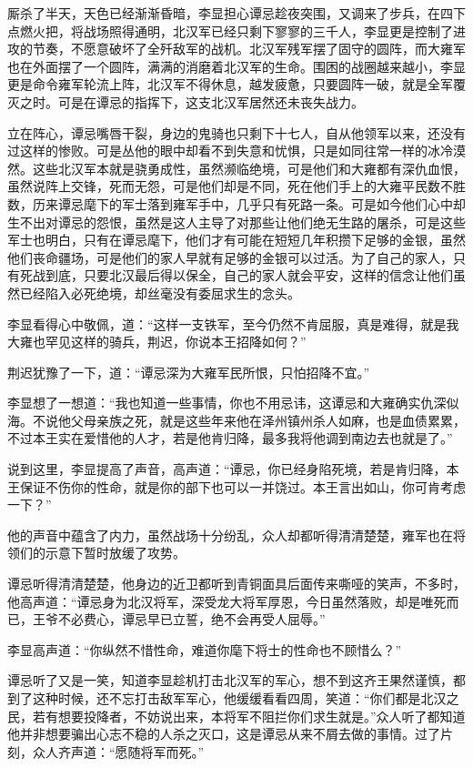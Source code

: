 厮杀了半天，天色已经渐渐昏暗，李显担心谭忌趁夜突围，又调来了步兵，在四下点燃火把，将战场照得通明，北汉军已经只剩下寥寥的三千人，李显更是控制了进攻的节奏，不愿意破坏了全歼敌军的战机。北汉军残军摆了固守的圆阵，而大雍军也在外面摆了一个圆阵，满满的消磨着北汉军的生命。围困的战圈越来越小，李显更是命令雍军轮流上阵，北汉军不得休息，越发疲惫，只要圆阵一破，就是全军覆灭之时。可是在谭忌的指挥下，这支北汉军居然还未丧失战力。

立在阵心，谭忌嘴唇干裂，身边的鬼骑也只剩下十七人，自从他领军以来，还没有过这样的惨败。可是丛他的眼中却看不到失意和忧惧，只是如同往常一样的冰冷漠然。这些北汉军本就是骁勇成性，虽然濒临绝境，可是他们和大雍都有深仇血恨，虽然说阵上交锋，死而无怨，可是他们却是不同，死在他们手上的大雍平民数不胜数，历来谭忌麾下的军士落到雍军手中，几乎只有死路一条。可是如今他们心中却生不出对谭忌的怨恨，虽然是这人主导了对那些让他们绝无生路的屠杀，可是这些军士也明白，只有在谭忌麾下，他们才有可能在短短几年积攒下足够的金银，虽然他们丧命疆场，可是他们的家人早就有足够的金银可以过活。为了自己的家人，只有死战到底，只要北汉最后得以保全，自己的家人就会平安，这样的信念让他们虽然已经陷入必死绝境，却丝毫没有委屈求生的念头。

李显看得心中敬佩，道：“这样一支铁军，至今仍然不肯屈服，真是难得，就是我大雍也罕见这样的骑兵，荆迟，你说本王招降如何？”

荆迟犹豫了一下，道：“谭忌深为大雍军民所恨，只怕招降不宜。”

李显想了一想道：“我也知道一些事情，你也不用忌讳，这谭忌和大雍确实仇深似海。不说他父母亲族之死，就是这些年来他在泽州镇州杀人如麻，也是血债累累，不过本王实在爱惜他的人才，若是他肯归降，最多我将他调到南边去也就是了。”

说到这里，李显提高了声音，高声道：“谭忌，你已经身陷死境，若是肯归降，本王保证不伤你的性命，就是你的部下也可以一并饶过。本王言出如山，你可肯考虑一下？”

他的声音中蕴含了内力，虽然战场十分纷乱，众人却都听得清清楚楚，雍军也在将领们的示意下暂时放缓了攻势。

谭忌听得清清楚楚，他身边的近卫都听到青铜面具后面传来嘶哑的笑声，不多时，他高声道：“谭忌身为北汉将军，深受龙大将军厚恩，今日虽然落败，却是唯死而已，王爷不必费心，谭忌早已立誓，绝不会再受人屈辱。”

李显高声道：“你纵然不惜性命，难道你麾下将士的性命也不顾惜么？”

谭忌听了又是一笑，知道李显趁机打击北汉军的军心，想不到这齐王果然谨慎，都到了这种时候，还不忘打击敌军军心，他缓缓看看四周，笑道：“你们都是北汉之民，若有想要投降者，不妨说出来，本将军不阻拦你们求生就是。”众人听了都知道他并非想要骗出心志不稳的人杀之灭口，这是谭忌从来不屑去做的事情。过了片刻，众人齐声道：“愿随将军而死。”

